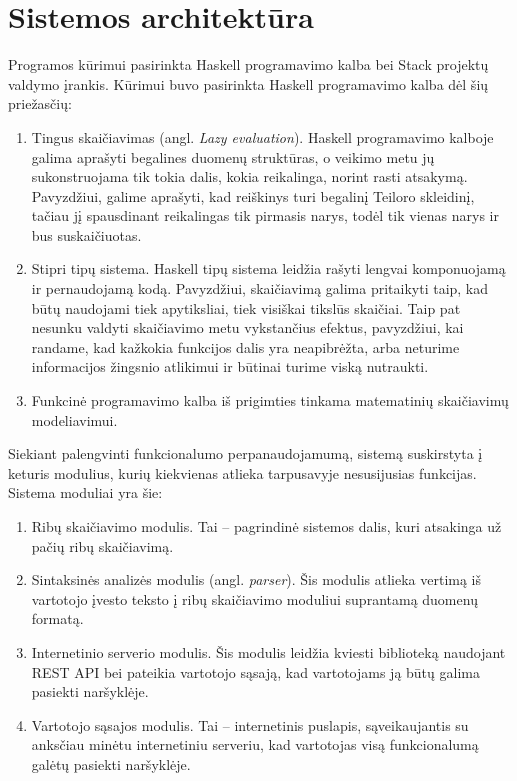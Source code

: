 \section{Sistemos architektūra}

Programos kūrimui pasirinkta Haskell programavimo kalba bei Stack projektų valdymo įrankis.
Kūrimui buvo pasirinkta Haskell programavimo kalba dėl šių priežasčių:
\begin{enumerate}
    \item Tingus skaičiavimas (angl. \textit{Lazy evaluation}). Haskell programavimo kalboje galima aprašyti begalines
        duomenų struktūras, o veikimo metu jų sukonstruojama tik tokia dalis, kokia reikalinga, norint rasti atsakymą.
        Pavyzdžiui, galime aprašyti, kad reiškinys turi begalinį Teiloro skleidinį, tačiau jį spausdinant reikalingas
        tik pirmasis narys, todėl tik vienas narys ir bus suskaičiuotas.
    \item Stipri tipų sistema. Haskell tipų sistema leidžia rašyti lengvai komponuojamą ir pernaudojamą kodą. Pavyzdžiui,
        skaičiavimą galima pritaikyti taip, kad būtų naudojami tiek apytiksliai, tiek visiškai tikslūs skaičiai. Taip pat
        nesunku valdyti skaičiavimo metu vykstančius efektus, pavyzdžiui, kai randame, kad kažkokia funkcijos dalis yra
        neapibrėžta, arba neturime informacijos žingsnio atlikimui ir būtinai turime viską nutraukti.
    \item Funkcinė programavimo kalba iš prigimties tinkama matematinių skaičiavimų modeliavimui.
\end{enumerate}

Siekiant palengvinti funkcionalumo perpanaudojamumą, sistemą suskirstyta į keturis modulius, kurių kiekvienas atlieka
tarpusavyje nesusijusias funkcijas. Sistema moduliai yra šie:
\begin{enumerate}
    \item Ribų skaičiavimo modulis. Tai -- pagrindinė sistemos dalis, kuri atsakinga už pačių ribų skaičiavimą.
    \item Sintaksinės analizės modulis (angl. \textit{parser}). Šis modulis atlieka vertimą iš vartotojo įvesto teksto į
        ribų skaičiavimo moduliui suprantamą duomenų formatą.
    \item Internetinio serverio modulis. Šis modulis leidžia kviesti biblioteką naudojant REST API bei pateikia vartotojo
        sąsają, kad vartotojams ją būtų galima pasiekti naršyklėje.
    \item Vartotojo sąsajos modulis. Tai -- internetinis puslapis, sąveikaujantis su anksčiau minėtu internetiniu serveriu,
        kad vartotojas visą funkcionalumą galėtų pasiekti naršyklėje.
\end{enumerate}
